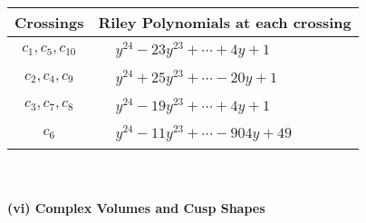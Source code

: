 \documentclass[1p]{elsarticle_modified}
\theoremstyle{definition}
\begin{document}
\begin{tabular}{m{50pt}|m{274pt}}
Crossings & \hspace{64pt}Riley Polynomials at each crossing \\
\hline $$\begin{aligned}c_{1},c_{5},c_{10}\end{aligned}$$&$\begin{aligned}
&y^{24}-23 y^{23}+\cdots+4 y+1
\end{aligned}$\\
\hline $$\begin{aligned}c_{2},c_{4},c_{9}\end{aligned}$$&$\begin{aligned}
&y^{24}+25 y^{23}+\cdots-20 y+1
\end{aligned}$\\
\hline $$\begin{aligned}c_{3},c_{7},c_{8}\end{aligned}$$&$\begin{aligned}
&y^{24}-19 y^{23}+\cdots+4 y+1
\end{aligned}$\\
\hline $$\begin{aligned}c_{6}\end{aligned}$$&$\begin{aligned}
&y^{24}-11 y^{23}+\cdots-904 y+49
\end{aligned}$\\
\hline
\end{tabular}\\~\\
\newpage\flushleft \textbf{(vi) Complex Volumes and Cusp Shapes}
\end{document}
